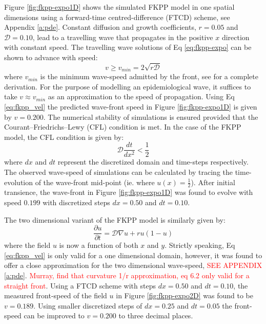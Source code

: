 Figure \ref{fig:fkpp-expo1D} shows the simulated FKPP model in one spatial dimensions using a forward-time centred-difference (FTCD) scheme, see Appendix \ref{a:pde}. Constant diffusion and growth coefficients, $r=0.05$ and $\mathcal{D}=0.10$, lead to a travelling wave that propagates in the positive $x$ direction with constant speed. The travelling wave solutions of Eq \ref{eq:fkpp-expo} can be shown to advance with speed:
\begin{equation}
    \label{eq:fkpp_vel}
    v \geq v_{min} = 2\sqrt{r\mathcal{D}}
\end{equation}
where $v_{min}$ is the minimum wave-speed admitted by the front, see \cite{murray1993mathematical} for a complete derivation. %
For the purpose of modelling an epidemiological wave, it suffices to take $v\approx v_{min}$ as an approximation to the speed of propagation. %
Using Eq \ref{eq:fkpp_vel} the predicted wave-front speed in Figure \ref{fig:fkpp-expo1D} is given by $v=0.200$. %
The numerical stability of simulations is ensured provided that the Courant–Friedrichs–Lewy (CFL) condition is met\cite{cfl-condition}. %
In the case of the FKPP model, the CFL condition is given by:
\begin{equation}
    \mathcal{D} \frac{dt}{dx^2} < \frac{1}{2}
\end{equation}
where $dx$ and $dt$ represent the discretized domain and time-steps respectively. %
The observed wave-speed of simulations can be calculated by %
tracing the time-evolution of the wave-front mid-point (ie. where $u(x) = \frac{1}{2}$). %
After initial transience, the wave-front in Figure  \ref{fig:fkpp-expo1D} was found to evolve with speed $0.199$ with discretized steps $dx=0.50$ and $dt=0.10$. %

The two dimensional variant of the FKPP model is similarly given by:
\begin{equation}
    \frac{\partial u}{\partial t} = \mathcal{D}\nabla u + ru(1 - u)
\end{equation}
where the field $u$ is now a function of both $x$ and $y$. %
Strictly speaking, Eq \ref{eq:fkpp_vel} is only valid for a one dimensional domain, however, it was found to offer a close approximation for the two dimensional wave-speed,  \textcolor{red}{SEE APPENDIX \ref{a:pde}}. %
\textcolor{red}{Murray, find that curvature 1/r approximation, eq 6.2 only valid for a straight front}. %
Using a FTCD scheme with steps $dx = 0.50$ and $dt = 0.10$, the measured front-speed of the field $u$ in Figure \ref{fig:fkpp-expo2D} was found to be $v=0.189$. %
Using smaller discretized steps of $dx = 0.25$ and $dt = 0.05$ the front-speed can be improved to $v=0.200$ to three decimal places.

